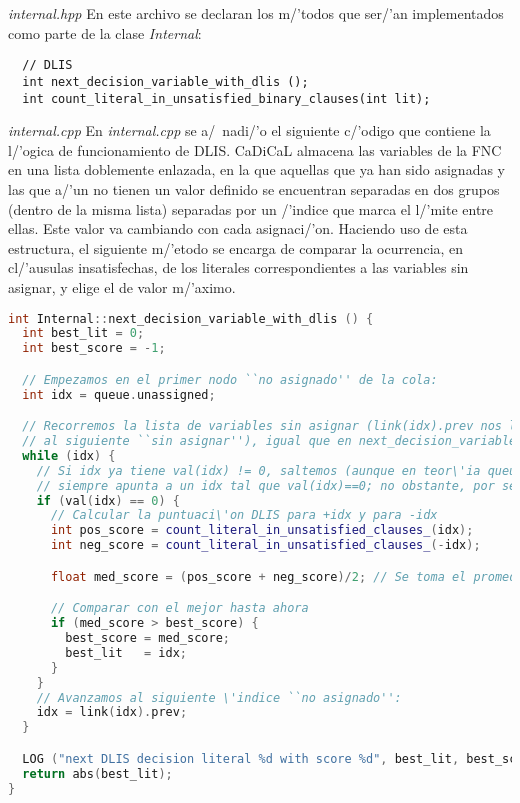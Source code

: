 {\textit{internal.hpp}}
En este archivo se declaran los m/'todos que ser/'an implementados como parte de la clase \textit{Internal}:

\begin{lstlisting}
  // DLIS
  int next_decision_variable_with_dlis ();
  int count_literal_in_unsatisfied_binary_clauses(int lit);
\end{lstlisting}

{\textit{internal.cpp}}
En \textit{internal.cpp} se a/~nadi/'o el siguiente c/'odigo que contiene la l/'ogica de funcionamiento de DLIS.
CaDiCaL almacena las variables de la FNC en una lista doblemente enlazada, en la que aquellas que ya han sido asignadas y las que a/'un no tienen un valor definido se encuentran separadas en dos grupos (dentro de la misma lista) separadas por un /'indice que marca el l/'mite entre ellas. Este valor va cambiando con cada asignaci/'on. Haciendo uso de esta estructura, el siguiente m/'etodo se encarga de comparar la ocurrencia, en cl/'ausulas insatisfechas, de los literales correspondientes a las variables sin asignar, y elige el de valor m/'aximo.

\begin{lstlisting}[escapechar=!., language=C++]
int Internal::next_decision_variable_with_dlis () {
  int best_lit = 0;
  int best_score = -1;

  // Empezamos en el primer nodo ``no asignado'' de la cola:
  int idx = queue.unassigned;

  // Recorremos la lista de variables sin asignar (link(idx).prev nos lleva
  // al siguiente ``sin asignar''), igual que en next_decision_variable_on_queue().
  while (idx) {
    // Si idx ya tiene val(idx) != 0, saltemos (aunque en teor\'ia queue.unassigned
    // siempre apunta a un idx tal que val(idx)==0; no obstante, por seguridad lo comprobamos).
    if (val(idx) == 0) {
      // Calcular la puntuaci\'on DLIS para +idx y para -idx
      int pos_score = count_literal_in_unsatisfied_clauses_(idx);
      int neg_score = count_literal_in_unsatisfied_clauses_(-idx);

      float med_score = (pos_score + neg_score)/2; // Se toma el promedio por la estrategia de phase

      // Comparar con el mejor hasta ahora
      if (med_score > best_score) {
        best_score = med_score;
        best_lit   = idx;    
      }      
    }
    // Avanzamos al siguiente \'indice ``no asignado'':
    idx = link(idx).prev;
  }

  LOG ("next DLIS decision literal %d with score %d", best_lit, best_score);
  return abs(best_lit);
}
\end{lstlisting}

